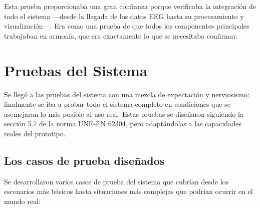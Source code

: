 Esta prueba proporcionaba una gran confianza porque verificaba la integración de todo el sistema —desde la llegada de los datos EEG hasta su procesamiento y visualización—. Era como una prueba de que todos los componentes principales trabajaban en armonía, que era exactamente lo que se necesitaba confirmar.

\newpage
\section{Pruebas del Sistema}

Se llegó a las pruebas del sistema con una mezcla de expectación y nerviosismo: finalmente se iba a probar todo el sistema completo en condiciones que se asemejaran lo más posible al uso real. Estas pruebas se diseñaron siguiendo la sección 5.7 de la norma UNE-EN 62304, pero adaptándolas a las capacidades reales del prototipo.

\subsection{Los casos de prueba diseñados}

Se desarrollaron varios casos de prueba del sistema que cubrían desde los escenarios más básicos hasta situaciones más complejas que podrían ocurrir en el mundo real:


